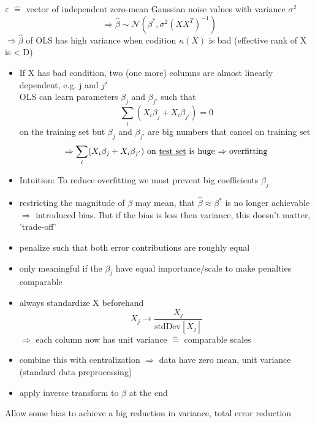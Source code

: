 \documentclass[11pt]{article}
\begin{document}
    $\varepsilon$ $\widehat{=}$ vector of independent zero-mean Gaussian noise values
    with variance $\sigma^2$
    \[ \Rightarrow \hat{\beta} \sim \mathcal{N}(\beta^*,\sigma^2(XX^T)^{-1})\]
    $\Rightarrow \hat{\beta}$ of OLS has high variance when codition $\kappa(X)$
    is bad (effective rank of X is < D)
    \begin{itemize}
      \item If X has bad condition, two (one more) columns are almost linearly
      dependent, e.g. j and $j'$ \\
      OLS can learn parameters $\beta_j$ and $\beta_{j'}$ such that
      \[\sum_i (X_i\beta_j+X_i\beta_{j'}) = 0\] on the training set but $\beta_j$
      and $\beta_{j'}$ are big numbers that cancel on training set
      \begin{equation*}
        \Rightarrow \sum_i
        (X_i\beta_j+X_i\beta_{j'}) \text{ on \underline{test set} is huge $\Rightarrow$
        overfitting}
      \end{equation*}
      \item Intuition: To reduce overfitting we must prevent big coefficients $\beta_j$
      \item restricting the magnitude of $\beta$ may mean, that $\hat{\beta} \approx
      \beta^*$ is no longer achievable $\Rightarrow$ introduced bias. But if the
      bias is less then variance, this doesn't matter, 'trade-off'
      \item penalize such that both error contributions are roughly equal
      \item only meaningful if the $\beta_j$ have equal importance/scale to make penalties comparable
      \item always standardize X beforehand
      \begin{equation*}
        X_j \to \frac{X_j}{\text{stdDev}[X_j]}
      \end{equation*}
      $\Rightarrow$ each column now has unit variance $\widehat{=}$ comparable scales
      \item combine this with centralization $\Rightarrow$ data have zero mean,
      unit variance (standard data preprocessing)
      \item apply inverse transform to $\beta$ at the end
    \end{itemize}
    Allow some bias to achieve a big reduction in variance, total error reduction
\end{document}
